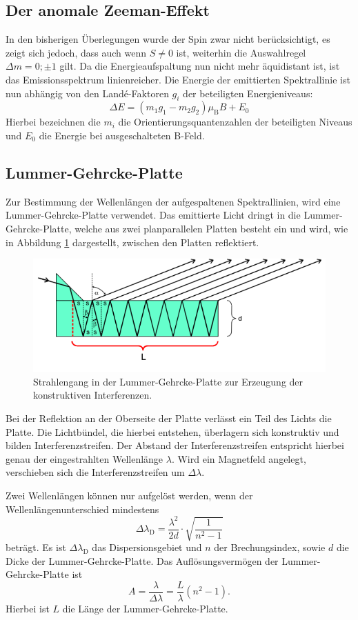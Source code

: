 \subsection{Der anomale Zeeman-Effekt}
In den bisherigen Überlegungen wurde der Spin zwar nicht berücksichtigt, es zeigt sich jedoch, dass auch wenn $S\neq 0$ ist, weiterhin die Auswahlregel $\Delta m=0 ; \pm 1$ gilt.
Da die Energieaufspaltung nun nicht mehr äquidistant ist, ist das Emissionsspektrum linienreicher.
Die Energie der emittierten Spektrallinie ist nun abhängig von den Landé-Faktoren $g_i$ der beteiligten Energieniveaus:
\begin{equation}
  \Delta E=\left(m_1g_1-m_2g_2\right)\mu_{\mathrm{B}}B+E_0
\end{equation}
Hierbei bezeichnen die $m_i$ die Orientierungsquantenzahlen der beteiligten Niveaus und $E_0$ die Energie bei ausgeschalteten B-Feld.

\subsection{Lummer-Gehrcke-Platte}
Zur Bestimmung der Wellenlängen der aufgespaltenen Spektrallinien, wird eine Lummer-Gehrcke-Platte verwendet.
Das emittierte Licht dringt in die Lummer-Gehrcke-Platte, welche aus zwei planparallelen Platten besteht ein und wird, wie in Abbildung \ref{fig:lummer} dargestellt, zwischen den Platten reflektiert.
\begin{figure}
  \centering
  \includegraphics[width=0.7\columnwidth]{pictures/lummer.png}
  \caption{Strahlengang in der Lummer-Gehrcke-Platte zur Erzeugung der konstruktiven Interferenzen.\cite{Anleitung}}
  \label{fig:lummer}
\end{figure}
Bei der Reflektion an der Oberseite der Platte verlässt ein Teil des Lichts die Platte.
Die Lichtbündel, die hierbei entstehen, überlagern sich konstruktiv und bilden Interferenzstreifen. Der Abstand der Interferenzstreifen entspricht hierbei genau der eingestrahlten Wellenlänge $\lambda$.
Wird ein Magnetfeld angelegt, verschieben sich die Interferenzstreifen um $\Delta \lambda$.

Zwei Wellenlängen können nur aufgelöst werden, wenn der Wellenlängenunterschied mindestens
\begin{equation}
  \label{dispersionsgebiet}
	\Delta \lambda_{\mathrm{D}} = \frac{\lambda^2}{2d} \cdot \sqrt{\frac{1}{n^2 - 1}}
\end{equation}
beträgt.
Es ist $\Delta \lambda_{\mathrm{D}}$ das Dispersionsgebiet und $n$ der Brechungsindex, sowie $d$ die Dicke der Lummer-Gehrcke-Platte.
Das Auflösungsvermögen der Lummer-Gehrcke-Platte ist
\begin{equation}
  A=\frac{\lambda}{\Delta \lambda}=\frac{L}{\lambda}\left(n^2-1\right)\mathrm{.}
\end{equation}
Hierbei ist $L$ die Länge der Lummer-Gehrcke-Platte.
